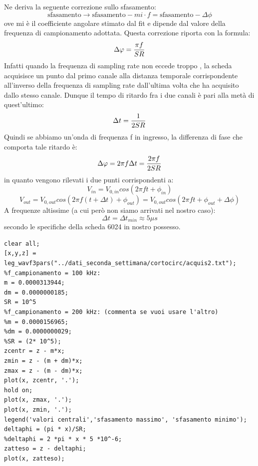 Ne deriva la seguente correzione sullo sfasamento:
 \begin{equation}
     \text{sfasamento} \rightarrow \text{sfasamento} - mi \cdot f = \text{sfasamento} - \Delta \phi
 \end{equation}
ove mi è il coefficiente angolare stimato dal fit e dipende dal valore della frequenza di campionamento adottata. 
Questa correzione riporta con la formula:
 \begin{equation}
     \Delta \phi = {{\pi  f}\over{SR}}
 \end{equation}
 Infatti quando la frequenza di sampling rate non eccede troppo , la scheda acquisisce un punto dal primo canale alla distanza temporale corrispondente all'inverso della frequenza di sampling rate dall'ultima volta che ha acquisito dallo stesso canale. Dunque il tempo di ritardo fra i due canali è pari alla metà di quest'ultimo:
 \begin{equation}
     \Delta t = {1\over{2 SR}}
 \end{equation}
 Quindi se abbiamo un'onda di frequenza f in ingresso, la differenza di fase che comporta tale ritardo è:
  \begin{equation}
     \Delta \phi = 2 \pi f \Delta t = {{2 \pi f}\over{2 SR}}
 \end{equation}
in quanto vengono rilevati i due punti corrispondenti a:
 \begin{equation}
     V_{in} = V_{0,in} cos(2 \pi f t + \phi_{in})
 \end{equation}
 \begin{equation}
     V_{out} = V_{0, out} cos(2 \pi f (t + \Delta t) + \phi_{out}) = V_{0, out} cos(2 \pi f t + \phi_{out} + \Delta \phi)
 \end{equation}
 A frequenze altissime (a cui però non siamo arrivati nel nostro caso):
 \begin{equation}
     \Delta t = \Delta t_{min} \approx 5 \mu s
 \end{equation}
 secondo le specifiche della scheda 6024 in nostro possesso.
 
 \begin{lstlisting}[frame=single]
 clear all;
[x,y,z] = leg_wavf3pars("../dati_seconda_settimana/cortocirc/acquis2.txt");
%f_campionamento = 100 kHz: 
m = 0.0000313944;
dm = 0.0000000185;
SR = 10^5
%f_campionamento = 200 kHz: (commenta se vuoi usare l'altro)
%m = 0.0000156965;
%dm = 0.0000000029;
%SR = (2* 10^5);
zcentr = z - m*x;
zmin = z - (m + dm)*x;
zmax = z - (m - dm)*x;
plot(x, zcentr, '.');
hold on;
plot(x, zmax, '.');
plot(x, zmin, '.');
legend('valori centrali','sfasamento massimo', 'sfasamento minimo');
deltaphi = (pi * x)/SR;
%deltaphi = 2 *pi * x * 5 *10^-6;
zatteso = z - deltaphi;
plot(x, zatteso);
\end{lstlisting}

